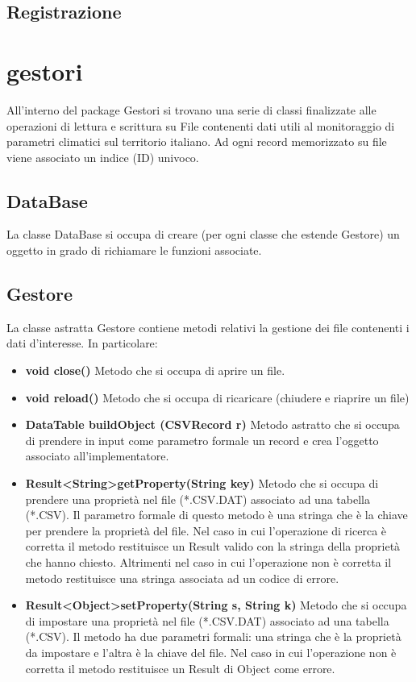 \documentclass[a4paper, 12pt]{report}
\begin{document}
			\subsection{Registrazione}

		\section{gestori}
		All'interno del package Gestori si trovano una serie di classi finalizzate alle operazioni di lettura e scrittura su File contenenti dati utili al monitoraggio di parametri climatici sul territorio italiano.
		Ad ogni record memorizzato su file viene associato un indice (ID) univoco.
			\subsection{DataBase}
			La classe DataBase si occupa di creare (per ogni classe che estende Gestore) un oggetto in grado di richiamare le funzioni associate.
			\subsection{Gestore}
			La classe astratta Gestore contiene metodi relativi la gestione dei file contenenti i dati d'interesse. In particolare:
			\begin{itemize}
				\item \textbf{void close()}
				Metodo che si occupa di aprire un file.
				\item \textbf{void reload()}
				Metodo che si occupa di ricaricare (chiudere e riaprire un file)

				\item \textbf {DataTable buildObject (CSVRecord r)}
				Metodo astratto che si occupa di prendere in input come parametro formale un record e crea l'oggetto associato all'implementatore.

				\item \textbf{Result\textless String\textgreater getProperty(String key)}
				Metodo che si occupa di prendere una proprietà nel file (*.CSV.DAT) associato ad una tabella (*.CSV). Il parametro formale di questo metodo è una stringa che è la chiave per prendere la proprietà del file. Nel caso in cui l'operazione di ricerca è corretta il metodo restituisce un Result valido con la stringa della proprietà che hanno chiesto. Altrimenti nel caso in cui l'operazione non è corretta il metodo restituisce una stringa associata ad un codice di errore.

				\item  \textbf{Result\textless Object\textgreater setProperty(String s, String k)}
				Metodo che si occupa di impostare una proprietà nel file (*.CSV.DAT) associato ad una tabella (*.CSV). Il metodo ha due parametri formali: una stringa che è la proprietà da impostare e l'altra è la chiave del file. Nel caso in cui l'operazione non è corretta il metodo restituisce un Result di Object come errore.
			\end{itemize}
\end{document}
